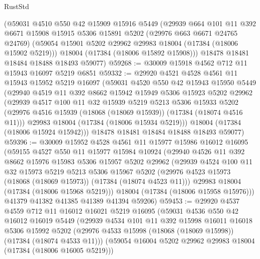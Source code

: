 \begin{lexlean}{RustStd}
\begin{coremodule}
    (@59031
      @4510
      @550
      @42
      @15909
      @15916
      @5449
      (@29939
        @664
        @101
        @11
        @392
        @6671
        @15908
        @15915
        @5306
        @15891
        @5202
        (@29976 @663 @6671 @24765 @24769)
        (@59054 @15901 @5202 @29962 @29983 @18004 (@17384 (@18006 @15902 @5219)))
        @18004
        (@17384 (@18006 @15892 @15908)))
      @18478
      @18481
      @18484
      @18488
      @18493
      @59077)
@59268 := @30009 @15918 @4562 @712 @11 @15943 @16097 @5219 @6851
@59332 := @29920
    @4521
    @4528
    @4561
    @11
    @15943
    @15952
    @5219
    @16097
    (@59031
      @4520
      @550
      @42
      @15943
      @15950
      @5449
      (@29940
        @4519
        @11
        @392
        @8662
        @15942
        @15949
        @5306
        @15923
        @5202
        @29962
        (@29939
          @4517
          @100
          @11
          @32
          @15939
          @5219
          @5213
          @5306
          @15933
          @5202
          (@29976 @4516 @15939 (@18068 (@18069 @15939)) (@17384 (@18074 @4516 @11)))
          @29983
          @18004
          (@17384 (@18006 @15934 @5219)))
        @18004
        (@17384 (@18006 @15924 @15942)))
      @18478
      @18481
      @18484
      @18488
      @18493
      @59077)
@59396 := @30009
    @15952
    @4528
    @4561
    @11
    @15977
    @15986
    @16012
    @16095
    (@59155
      @4527
      @550
      @11
      @15977
      @15984
      @10924
      (@29940
        @4526
        @11
        @392
        @8662
        @15976
        @15983
        @5306
        @15957
        @5202
        @29962
        (@29939
          @4524
          @100
          @11
          @32
          @15973
          @5219
          @5213
          @5306
          @15967
          @5202
          (@29976 @4523 @15973 (@18068 (@18069 @15973)) (@17384 (@18074 @4523 @11)))
          @29983
          @18004
          (@17384 (@18006 @15968 @5219)))
        @18004
        (@17384 (@18006 @15958 @15976)))
      @41379
      @41382
      @41385
      @41389
      @41394
      @59206)
@59453 := @29920
    @4537
    @4559
    @712
    @11
    @16012
    @16021
    @5219
    @16095
    (@59031
      @4536
      @550
      @42
      @16012
      @16019
      @5449
      (@29939
        @4534
        @101
        @11
        @392
        @15998
        @16011
        @16018
        @5306
        @15992
        @5202
        (@29976 @4533 @15998 (@18068 (@18069 @15998)) (@17384 (@18074 @4533 @11)))
        (@59054 @16004 @5202 @29962 @29983 @18004 (@17384 (@18006 @16005 @5219)))

\end{coremodule}
\end{lexlean}
